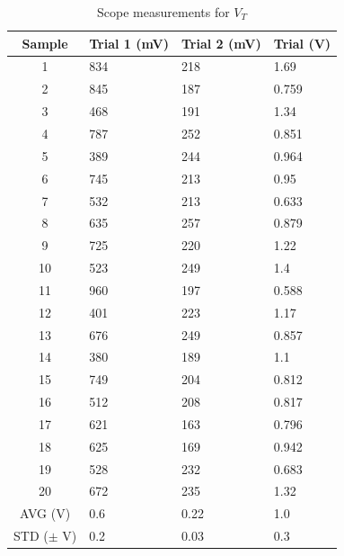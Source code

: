 \documentclass[../main.tex]{subfiles}
\begin{document}
\begin{table}[!ht]
    \centering
    \begin{tabular}{|c|l|l|l|}
    \hline
        Sample & Trial 1 (mV) & Trial 2 (mV) & Trial (V) \\ \hline
        1 & 834 & 218 & 1.69 \\ \hline
        2 & 845 & 187 & 0.759 \\ \hline
        3 & 468 & 191 & 1.34 \\ \hline
        4 & 787 & 252 & 0.851 \\ \hline
        5 & 389 & 244 & 0.964 \\ \hline
        6 & 745 & 213 & 0.95 \\ \hline
        7 & 532 & 213 & 0.633 \\ \hline
        8 & 635 & 257 & 0.879 \\ \hline
        9 & 725 & 220 & 1.22 \\ \hline
        10 & 523 & 249 & 1.4 \\ \hline
        11 & 960 & 197 & 0.588 \\ \hline
        12 & 401 & 223 & 1.17 \\ \hline
        13 & 676 & 249 & 0.857 \\ \hline
        14 & 380 & 189 & 1.1 \\ \hline
        15 & 749 & 204 & 0.812 \\ \hline
        16 & 512 & 208 & 0.817 \\ \hline
        17 & 621 & 163 & 0.796 \\ \hline
        18 & 625 & 169 & 0.942 \\ \hline
        19 & 528 & 232 & 0.683 \\ \hline
        20 & 672 & 235 & 1.32 \\ \hline
        AVG (V) & 0.6 & 0.22 & 1.0 \\ \hline
        STD ($\pm$ V) & 0.2 & 0.03 & 0.3 \\ \hline
    \end{tabular}
    \caption{Scope measurements for $V_T$}
    \label{tab:2}
\end{table}
\end{document}
